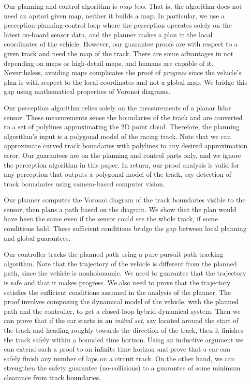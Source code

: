 Our planning and control algorithm is \emph{map-less}.
%
That is, the algorithm does not need an apriori given map, neither it builds a map.
%
In particular, we use a perception-planning-control loop where the perception operates solely on the latest on-board sensor data, and the planner makes a plan in the local coordinates of the vehicle.
%
However, our guarantee proofs are with respect to a given track and need the map of the track.
%
There are some advantages in not depending on maps or high-detail maps, and humans are capable of it.
%
Nevertheless, avoiding maps complicates the proof of \emph{progress} since the vehicle's plan is with respect to the local coordinates and not a global map.
%
We bridge this gap using mathematical properties of Voronoi diagrams.


Our perception algorithm relies solely on the measurements of a planar lidar sensor.
%
These measurements sense the boundaries of the track and are converted to a set of polylines approximating the 2D point cloud.
%
Therefore, the planning algorithm's input is a polygonal model of the racing track.
%
Note that we can approximate curved track boundaries with polylines to any desired approximation error.
%
Our guarantees are on the planning and control parts only, and we ignore the perception algorithm in this paper.
%
In return, our proof analysis is valid for any perception that outputs a polygonal model of the track, say detection of track boundaries using camera-based computer vision.


Our planner computes the Voronoi diagram of the track boundaries visible to the sensor, then plans a path based on the diagram.
%
We show that the plan would have been the same even if the sensor could see the whole track, if some conditions hold.
%
These sufficient conditions bridge the gap between local planning and global guarantees.


Our controller tracks the planned path using a pure-pursuit path-tracking algorithm.
%
Note that the trajectory of the vehicle is different from the planned path, since the vehicle is nonholonomic.
%
We need to guarantee that the trajectory is safe and that it makes progress.
%
We also need to prove that the trajectory satisfies the sufficient conditions assumed in the analysis of the planner.
%
The proof involves composing the dynamical model of the vehicle, with the planned path and the controller, to get a closed-loop hybrid dynamical system.
%
Then we can prove that if the car starts in an \emph{initial set}, say located around the start of the track and heading roughly towards the direction of the track, then it finishes the track safely within a bounded time horizon.
%
Using an inductive argument we can extend such a proof to an infinite time horizon and prove that a car can safely finish any number of laps on a circuit track.
%
On the other hand, we can strengthen the safety guarantee (no-collisions) to a guarantee of some minimum clearance from track boundaries.

